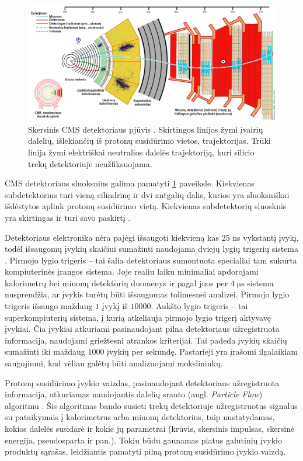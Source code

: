 \documentclass[a4paper, 12pt, oneside]{article}
\begin{document}
\vspace{0.2cm}
\begin{figure}[H]
	\includegraphics[width=\textwidth]{CMSslice_LT.png}
	\caption{\label{fig:CMSslice}Skersinis CMS detektoriaus pjūvis \cite{CMSslice}.
	Skirtingos linijos žymi įvairių dalelių, išlekiančių iš protonų susidūrimo vietos, trajektorijas.
	Trūki linija žymi elektriškai neutralios dalelės trajektoriją, kuri silicio trekų detektoriuje
	neužfiksuojama.}
\end{figure}

CMS detektoriaus sluoksnius galima pamatyti \ref{fig:CMSslice} paveiksle.
Kiekvienas subdetektorius turi vieną cilindrinę ir dvi antgalių dalis, kurios yra sluoksniškai išdėstytos
aplink protonų susidūrimo vietą.
Kiekvienas subdetektorių sluosknis yra skirtingas ir turi savo paskirtį \cite{CMSexperiment}.

Detektoriaus elektronika nėra pajėgi išsaugoti kiekvieną kas $25$ ns vykstantį įvykį, todėl išsaugomų
įvykių skaičiui sumažinti naudojama dviejų lygių trigerių sistema \cite{CMStrig}.
Pirmojo lygio trigeris -- tai šalia detektoriaus sumontuota specialiai tam sukurta kompiuterinės
įrangos sistema.
Joje realiu laiku minimaliai apdorojami kalorimetrų bei miuonų detektorių duomenys ir pagal juos per
$4 \; \mathrm{\mu s}$ sistema nusprendžia, ar įvykis turėtų būti išsaugomas tolimesnei analizei. 
Pirmojo lygio trigeris išsaugo maždaug $1$ įvykį iš $10000$.
Aukšto lygio trigeris -- tai superkompiuterių sistema, į kurią atkeliauja pirmojo lygio trigerį
aktyvavę įvykiai.
Čia įvykiai atkuriami pasinaudojant pilna detektoriaus užregistruota informacija, naudojami
griežtesni atrankos kriterijai.
Tai padeda įvykių skaičių sumažinti iki maždaug $1000$ įvykių per sekundę.
Pastarieji yra įrašomi ilgalaikiam saugojimui, kad vėliau galėtų būti analizuojami mokslininkų.

Protonų susidūrimo įvykio vaizdas, pasinaudojant detektoriaus užregistruota informacija, atkuriamas naudojantis
dalelių srauto (angl. \textit{Particle Flow}) algoritmu \cite{ParticleFlow}.
Šis algoritmas bando susieti trekų detektoriuje užregistruotus signalus su pataikymais į kalorimetrus arba miuonų
detektorius, taip nustatydamas, kokios dalelės susidarė ir kokie jų parametrai (krūvis, skersinis impulsas,
skersinė energija, pseudosparta ir pan.).
Tokiu būdu gaunamas platus galutinių įvykio produktų sąrašas, leidžiantis pamatyti pilną protonų susidūrimo įvykio vaizdą.
\end{document}
